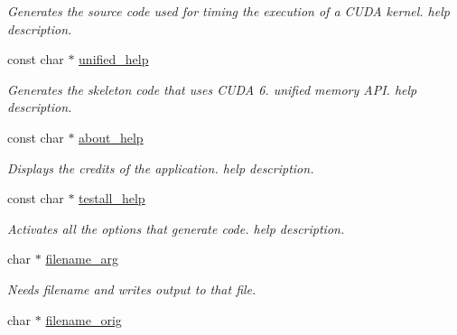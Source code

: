 \begin{DoxyCompactItemize}
\begin{DoxyCompactList}\small\item\em Generates the source code used for timing the execution of a C\-U\-D\-A kernel. help description. \end{DoxyCompactList}\item 
\hypertarget{structgengetopt__args__info_a88a9c13d6c59adeacfbdde87c2027bc3}{const char $\ast$ \hyperlink{structgengetopt__args__info_a88a9c13d6c59adeacfbdde87c2027bc3}{unified\-\_\-help}}\label{structgengetopt__args__info_a88a9c13d6c59adeacfbdde87c2027bc3}

\begin{DoxyCompactList}\small\item\em Generates the skeleton code that uses C\-U\-D\-A 6. unified memory A\-P\-I. help description. \end{DoxyCompactList}\item 
\hypertarget{structgengetopt__args__info_abd0135c7c74fb9d708724964c3f1af95}{const char $\ast$ \hyperlink{structgengetopt__args__info_abd0135c7c74fb9d708724964c3f1af95}{about\-\_\-help}}\label{structgengetopt__args__info_abd0135c7c74fb9d708724964c3f1af95}

\begin{DoxyCompactList}\small\item\em Displays the credits of the application. help description. \end{DoxyCompactList}\item 
\hypertarget{structgengetopt__args__info_a575ab5e9d298ecc5819a330d301d2871}{const char $\ast$ \hyperlink{structgengetopt__args__info_a575ab5e9d298ecc5819a330d301d2871}{testall\-\_\-help}}\label{structgengetopt__args__info_a575ab5e9d298ecc5819a330d301d2871}

\begin{DoxyCompactList}\small\item\em Activates all the options that generate code. help description. \end{DoxyCompactList}\item 
\hypertarget{structgengetopt__args__info_a85d92eb7188f93f9648abcd85e11358d}{char $\ast$ \hyperlink{structgengetopt__args__info_a85d92eb7188f93f9648abcd85e11358d}{filename\-\_\-arg}}\label{structgengetopt__args__info_a85d92eb7188f93f9648abcd85e11358d}

\begin{DoxyCompactList}\small\item\em Needs filename and writes output to that file. \end{DoxyCompactList}\item 
\hypertarget{structgengetopt__args__info_ad3ed0572cb8c03f22d007dce1e8a561e}{char $\ast$ \hyperlink{structgengetopt__args__info_ad3ed0572cb8c03f22d007dce1e8a561e}{filename\-\_\-orig}}\label{structgengetopt__args__info_ad3ed0572cb8c03f22d007dce1e8a561e}


\end{DoxyCompactItemize}
